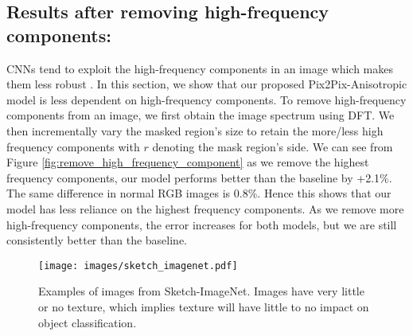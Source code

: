 \documentclass{bmvc2k}
\begin{document}
\subsection{Results after removing high-frequency components:}
CNNs tend to exploit the high-frequency components in an image which makes them less robust \cite{wang2020high,ilyas2019adversarial}. In this section, we show that our proposed Pix2Pix-Anisotropic model is less dependent on high-frequency components. To remove high-frequency components from an image, we first obtain the image spectrum using DFT. 
We then incrementally vary the masked region's size to retain the more/less high frequency components with $r$ denoting the mask region's side.
We can see from  Figure \ref{fig:remove_high_frequency_component} as we remove the highest frequency components, our model performs better than the baseline by +2.1\%. The same difference in normal RGB images is 0.8\%. Hence this shows that our model has less reliance on the highest frequency components.
As we remove more high-frequency components, the error increases for both models, but we are still consistently better than the baseline.





















\begin{figure*}[t!]
    \centering
    \texttt{[image: images/sketch\_imagenet.pdf]}
\caption{Examples of images from Sketch-ImageNet. Images have very little or no texture, which implies texture will have little to no impact on object classification.}
\label{fig:sketch_images}
\end{figure*}
\end{document}
